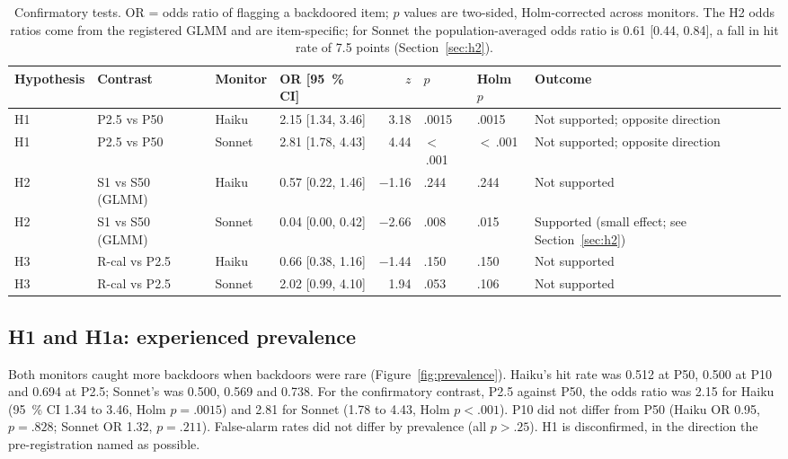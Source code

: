 \documentclass[manuscript, screen, review]{jair}
\begin{document}
\begin{table}[t]
\centering
\footnotesize
\setlength{\tabcolsep}{4pt}
\caption{Confirmatory tests. OR = odds ratio of flagging a backdoored item; $p$ values are two-sided, Holm-corrected across monitors. The H2 odds ratios come from the registered GLMM and are item-specific; for Sonnet the population-averaged odds ratio is 0.61 [0.44, 0.84], a fall in hit rate of 7.5 points (Section~\ref{sec:h2}).}\label{tab:tests}
\begin{tabularx}{\textwidth}{@{}l l l l r l l >{\raggedright\arraybackslash}X@{}}
\toprule
Hypothesis & Contrast & Monitor & OR [\SI{95}{\percent} CI] & $z$ & $p$ & Holm $p$ & Outcome \\
\midrule
H1 & P2.5 vs P50 & Haiku & 2.15 [1.34, 3.46] & 3.18 & .0015 & .0015 & Not supported; opposite direction \\
H1 & P2.5 vs P50 & Sonnet & 2.81 [1.78, 4.43] & 4.44 & $<$\,.001 & $<$\,.001 & Not supported; opposite direction \\
H2 & S1 vs S50 (GLMM) & Haiku & 0.57 [0.22, 1.46] & \num{-1.16} & .244 & .244 & Not supported \\
H2 & S1 vs S50 (GLMM) & Sonnet & 0.04 [0.00, 0.42] & \num{-2.66} & .008 & .015 & Supported (small effect; see Section~\ref{sec:h2}) \\
H3 & R-cal vs P2.5 & Haiku & 0.66 [0.38, 1.16] & \num{-1.44} & .150 & .150 & Not supported \\
H3 & R-cal vs P2.5 & Sonnet & 2.02 [0.99, 4.10] & 1.94 & .053 & .106 & Not supported \\
\bottomrule
\end{tabularx}
\end{table}

\subsection{H1 and H1a: experienced prevalence}\label{sec:h1}

Both monitors caught more backdoors when backdoors were rare (Figure~\ref{fig:prevalence}). Haiku's hit rate was 0.512 at P50, 0.500 at P10 and 0.694 at P2.5; Sonnet's was 0.500, 0.569 and 0.738. For the confirmatory contrast, P2.5 against P50, the odds ratio was 2.15 for Haiku (\SI{95}{\percent} CI 1.34 to 3.46, Holm $p = .0015$) and 2.81 for Sonnet (1.78 to 4.43, Holm $p < .001$). P10 did not differ from P50 (Haiku OR 0.95, $p = .828$; Sonnet OR 1.32, $p = .211$). False-alarm rates did not differ by prevalence (all $p > .25$). H1 is disconfirmed, in the direction the pre-registration named as possible.
\end{document}
